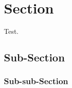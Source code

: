 \newcommand{\homedir}{/home/bscholtz/workspace/workspace-latex/templates/latex-template-uct/}



\newcommand{\coursecode}{EEE4XXXX}
\newcommand{\assignment}{Assignment One}
\newcommand{\lecturer}{Prof. Ed Boje}





\newpage


\newpage

\newpage
\afterpage{\null\newpage}


\newpage
\tableofcontents

\newpage
\listoffigures

\newpage
\listoftables

\newpage

\pagestyle{fancy}
\fancyhf{}
\fancyhead[LE]{\textit{\nouppercase{\leftmark}}}
\fancyhead[RO]{\textit{\nouppercase{\leftmark}}}
\fancyhead[RE]{\textit{\nouppercase{\thepage}}}
\fancyhead[LO]{\textit{\nouppercase{\thepage}}}
\renewcommand{\headrulewidth}{2pt}
\renewcommand{\footrulewidth}{0pt}


\section{Section}
Test.\cite[p. 215]{control}

\lipsum

\newpage
\subsection{Sub-Section}
\subsubsection{Sub-sub-Section}

